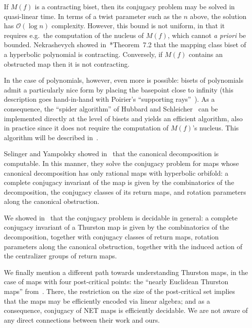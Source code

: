 \documentclass{amsart}
\begin{document}
If $M(f)$ is a contracting biset, then its conjugacy problem may be
solved in quasi-linear time. In terms of a twist parameter such as the
$n$ above, the solution has $\mathcal O(\log n)$ complexity. However,
this bound is not uniform, in that it requires e.g.\ the computation
of the nucleus of $M(f)$, which cannot \emph{a priori} be
bounded. Nekrashevych showed
in~\cite{nekrashevych:combinatorialmodels}*{Theorem~7.2} that the
mapping class biset of a hyperbolic polynomial is
contracting. Conversely, if $M(f)$ contains an obstructed map then it
is not contracting.

In the case of polynomials, however, even more is possible: bisets of
polynomials admit a particularly nice form by placing the basepoint
close to infinity (this description goes hand-in-hand with Poirier's
``supporting rays''~\cite{poirier:portraits}). As a consequence, the
``spider algorithm'' of Hubbard and Schleicher~\cite{hubbard-s:spider}
can be implemented directly at the level of bisets and yields an
efficient algorithm, also in practice since it does not require the
computation of $M(f)$'s nucleus. This algorithm will be described
in~\cite{bartholdi-dudko:bc5}.

Selinger and Yampolsky showed
in~\cite{selinger-yampolsky:geometrization} that the canonical
decomposition is computable. In this manner, they solve the conjugacy
problem for maps whose canonical decomposition has only rational maps
with hyperbolic orbifold: a complete conjugacy invariant of the map is
given by the combinatorics of the decomposition, the conjugacy classes
of its return maps, and rotation parameters along the canonical
obstruction.

We showed in~\cite{bartholdi-dudko:bc2} that the conjugacy problem is
decidable in general: a complete conjugacy invariant of a Thurston map
is given by the combinatorics of the decomposition, together with
conjugacy classes of return maps, rotation parameters along the
canonical obstruction, together with the induced action of the
centralizer groups of return maps.

We finally mention a different path towards understanding Thurston
maps, in the case of maps with four post-critical points: the ``nearly
Euclidean Thurston maps''
from~\cite{cannon-floyd-parry-pilgrim:net}. There, the restriction on
the size of the post-critical set implies that the maps may be
efficiently encoded via linear algebra; and as a consequence,
conjugacy of NET maps is efficiently decidable. We are not aware of
any direct connections between their work and ours.
\end{document}
